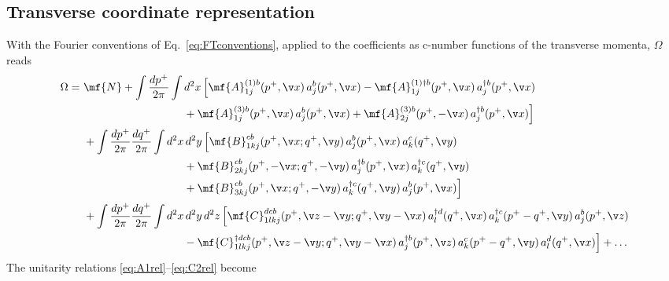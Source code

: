 \subsection{Transverse coordinate representation}\label{subsec:omegacoord}
With the Fourier conventions of Eq.~\eqref{eq:FTconventions}, applied to the coefficients as c-number
functions of the transverse momenta, $\Omega$ reads
\begin{align}\label{eq:OmegaCoord}
\Omega=\ &\mf{N}
+\int\frac{dp^+}{2\pi}\int d^2x\,\Big[\mf{A}^{(1)b}_{1j}(p^{+},\v x)\,a^{b}_{j}(p^{+},\v x)
-\mf{A}^{(1)\dagger b}_{1j}(p^{+},\v x)\,a^{\dagger b}_{j}(p^{+},\v x)\notag\\
&\hspace{3.2cm}+\mf{A}^{(3)b}_{1j}(p^{+},\v x)\,a^{b}_{j}(p^{+},\v x)
+\mf{A}^{(3)b}_{2j}(p^{+},-\v x)\,a^{\dagger b}_{j}(p^{+},\v x)\Big]\notag\\
&+\int\frac{dp^+}{2\pi}\frac{dq^+}{2\pi}\int d^2x\,d^2y\,\Big[\mf{B}^{cb}_{1kj}(p^{+},\v x;q^{+},\v y)\,a^{b}_{j}(p^{+},\v x)\,a^{c}_{k}(q^{+},\v y)\notag\\
&\hspace{3.2cm}+\mf{B}^{cb}_{2kj}(p^{+},-\v x;q^{+},-\v y)\,a^{\dagger b}_{j}(p^{+},\v x)\,a^{\dagger c}_{k}(q^{+},\v y)\notag\\
&\hspace{3.2cm}+\mf{B}^{cb}_{3kj}(p^{+},\v x;q^{+},-\v y)\,a^{\dagger c}_{k}(q^{+},\v y)\,a^{b}_{j}(p^{+},\v x)\Big]\notag\\
&+\int\frac{dp^+}{2\pi}\frac{dq^+}{2\pi}\int d^2x\,d^2y\,d^2z\,\Big[\mf{C}^{dcb}_{1lkj}(p^{+},\v z-\v y;q^{+},\v y-\v x)\,
a^{\dagger d}_{l}(q^{+},\v x)\,a^{\dagger c}_{k}(p^{+}-q^{+},\v y)\,a^{b}_{j}(p^{+},\v z)\notag\\
&\hspace{3.2cm}-\mf{C}^{\dagger dcb}_{1lkj}(p^{+},\v z-\v y;q^{+},\v y-\v x)\,
a^{\dagger b}_{j}(p^{+},\v z)\,a^{c}_{k}(p^{+}-q^{+},\v y)\,a^{d}_{l}(q^{+},\v x)\Big]+\dots
\end{align}
The unitarity relations \eqref{eq:A1rel}--\eqref{eq:C2rel} become
